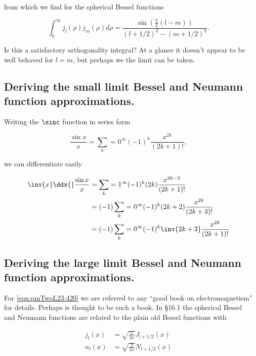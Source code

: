 from which we find for the spherical Bessel functions

\begin{equation}\label{eqn:qmTwoL23:660}
\int_0^\infty j_l(\rho) j_m(\rho) d\rho =
\frac{\sin\left(\frac{\pi}{2}\left( l - m \right) \right) }{(l+ 1/2)^2 - (m + 1/2)^2}.
\end{equation}

Is this a satisfactory orthogonality integral?  At a glance it doesn't appear to be well behaved for $l = m$, but perhaps we the limit can be taken.

\subsection{Deriving the small limit Bessel and Neumann function approximations.}

Writing the $\sinc$ function in series form

\begin{equation}\label{eqn:qmTwoL23:800}
\frac{\sin x}{x} = \sum_k=0^\infty (-1)^k \frac{x^{2k}}{(2k + 1)!},
\end{equation}

we can differentiate easily

\begin{equation}\label{eqn:qmTwoL23:820}
\begin{aligned}
\inv{x} \ddx{} \frac{\sin x}{x} 
&= \sum_k=1^\infty (-1)^k (2k) \frac{x^{2k-2}}{(2k + 1)!} \\
&= (-1) \sum_k=0^\infty (-1)^k (2k + 2) \frac{x^{2k}}{(2k + 3)!} \\
&= (-1) \sum_k=0^\infty (-1)^k \inv{2k + 3} \frac{x^{2k}}{(2k + 1)!} \\
\end{aligned}
\end{equation}

\subsection{Deriving the large limit Bessel and Neumann function approximations.}

For \ref{eqn:qmTwoL23:420} we are referred to any ``good book on electromagnetism'' for details.  Perhaps \cite{jackson1975cew} is thought to be such a book.  In \S 16.1 the spherical Bessel and Neumann functions are related to the plain old Bessel functions with

\begin{align}\label{eqn:qmTwoL23:440}
j_l(x) &= \sqrt{\frac{\pi}{2x} } J_{l+1/2}(x) \\
n_l(x) &= \sqrt{\frac{\pi}{2x} } N_{l+1/2}(x)
\end{align}

